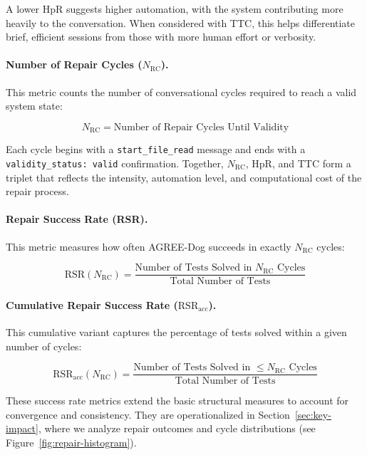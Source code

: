 A lower HpR suggests higher automation, with the system contributing more heavily to the conversation. When considered with TTC, this helps differentiate brief, efficient sessions from those with more human effort or verbosity.

\paragraph{\textbf{Number of Repair Cycles (\(N_{\mathrm{RC}}\))}.}
This metric counts the number of conversational cycles required to reach a valid system state:

\begin{equation}
N_{\mathrm{RC}} = \text{Number of Repair Cycles Until Validity}
\label{eq:nrc}
\end{equation}

Each cycle begins with a \texttt{start\_file\_read} message and ends with a \texttt{validity\_status: valid} confirmation. Together, \(N_{\mathrm{RC}}\), HpR, and TTC form a triplet that reflects the intensity, automation level, and computational cost of the repair process.

\paragraph{\textbf{Repair Success Rate (RSR)}.}
This metric measures how often AGREE-Dog succeeds in exactly \(N_{\mathrm{RC}}\) cycles:

\begin{equation}
\text{RSR}(N_{\mathrm{RC}}) = 
\frac{
\text{Number of Tests Solved in } N_{\mathrm{RC}} \text{ Cycles}
}{
\text{Total Number of Tests}
}
\label{eq:rsr}
\end{equation}

\paragraph{\textbf{Cumulative Repair Success Rate} (\( \text{RSR}_{\text{acc}} \)).}
This cumulative variant captures the percentage of tests solved within a given number of cycles:

\begin{equation}
\text{RSR}_{\text{acc}}(N_{\mathrm{RC}}) = 
\frac{
\text{Number of Tests Solved in } \leq N_{\mathrm{RC}} \text{ Cycles}
}{
\text{Total Number of Tests}
}
\label{eq:rsr-acc}
\end{equation}

These success rate metrics extend the basic structural measures to account for convergence and consistency. They are operationalized in Section~\ref{sec:key-impact}, where we analyze repair outcomes and cycle distributions (see Figure~\ref{fig:repair-histogram}).


